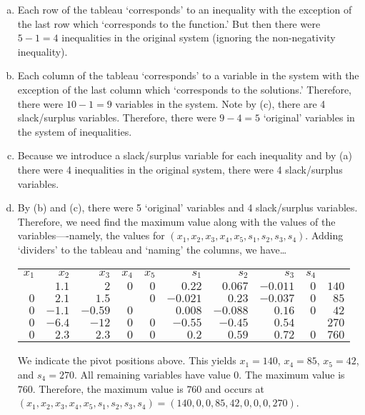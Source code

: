 \documentclass[11pt,letterpaper]{article}
\begin{document}
\sol 
\begin{enumerate}[(a)]
\item Each row of the tableau `corresponds' to an inequality with the exception of the last row which `corresponds to the function.' But then there were $5 - 1= 4$ inequalities in the original system (ignoring the non-negativity inequality). \pspace

\item Each column of the tableau `corresponds' to a variable in the system with the exception of the last column which `corresponds to the solutions.' Therefore, there were $10 - 1= 9$ variables in the system. Note by (c), there are 4 slack/surplus variables. Therefore, there were $9 - 4= 5$ `original' variables in the system of inequalities. \pspace

\item Because we introduce a slack/surplus variable for each inequality and by (a) there were 4 inequalities in the original system, there were 4 slack/surplus variables. \pspace

\item By (b) and (c), there were 5 `original' variables and 4 slack/surplus variables. Therefore, we need find the maximum value along with the values of the variables----namely, the values for $(x_1, x_2, x_3, x_4, x_5, s_1, s_2, s_3, s_4)$. Adding `dividers' to the tableau and `naming' the columns, we have\dots \par
	\begin{table}[!ht]
	\centering
	\begin{tabular}{rrrrrrrrr|r}
	{\small $x_1$} & {\small $x_2$} & {\small $x_3$} & {\small $x_4$} & {\small $x_5$} & {\small $s_1$} & {\small $s_2$} & {\small $s_3$} & {\small $s_4$} & \\
	\boxed{$1$} & $1.1$ & $2$ & $0$ & $0$ & $0.22$ & $0.067$ & $-0.011$ & $0$ & $140$ \\
	$0$ & $2.1$ & $1.5$ & \boxed{$1$} & $0$ & $-0.021$ & $0.23$ & $-0.037$ & $0$ & $85$ \\
	$0$ & $-1.1$ & $-0.59$ & $0$ & \boxed{$1$} & $0.008$ & $-0.088$ & $0.16$ & $0$ & $42$ \\
	$0$ & $-6.4$ & $-12$ & $0$ & $0$ & $-0.55$ & $-0.45$ & $0.54$ & \boxed{$1$} & $270$ \\ \hline
	$0$ & $2.3$ & $2.3$ & $0$ & $0$ & $0.2$ & $0.59$ & $0.72$ & $0$ & $760$ \\
	\end{tabular}
	\end{table} \par
We indicate the pivot positions above. This yields $x_1= 140$, $x_4= 85$, $x_5= 42$, and $s_4= 270$. All remaining variables have value 0. The maximum value is $760$. Therefore, the maximum value is $760$ and occurs at $(x_1, x_2, x_3, x_4, x_5, s_1, s_2, s_3, s_4)= (140, 0, 0, 85, 42, 0, 0, 0, 270)$. 
\end{enumerate}
\end{document}
